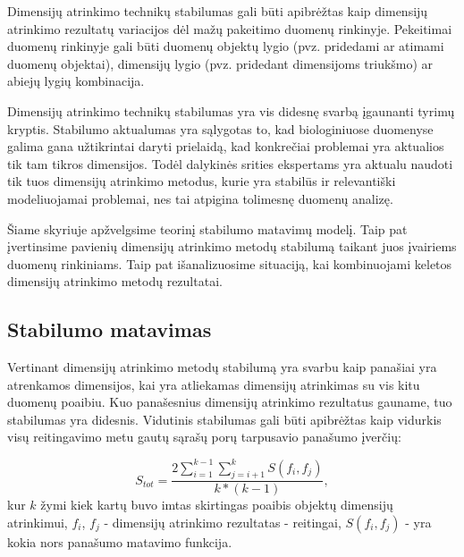 Dimensijų atrinkimo technikų stabilumas gali būti apibrėžtas kaip dimensijų
atrinkimo rezultatų variacijos dėl mažų pakeitimo duomenų rinkinyje. Pekeitimai
duomenų rinkinyje gali būti duomenų objektų lygio (pvz. pridedami ar atimami
duomenų objektai), dimensijų lygio (pvz. pridedant dimensijoms triukšmo) ar
abiejų lygių kombinacija.

Dimensijų atrinkimo technikų stabilumas yra vis didesnę svarbą įgaunanti tyrimų
kryptis. Stabilumo aktualumas yra sąlygotas to, kad biologiniuose duomenyse
galima gana užtikrintai daryti prielaidą, kad konkrečiai problemai yra
aktualios tik tam tikros dimensijos. Todėl dalykinės srities ekspertams yra
aktualu naudoti tik tuos dimensijų atrinkimo metodus, kurie yra stabilūs ir 
relevantiški modeliuojamai problemai, nes tai atpigina tolimesnę duomenų
analizę. 

Šiame skyriuje apžvelgsime teorinį stabilumo matavimų modelį.
Taip pat įvertinsime pavienių dimensijų atrinkimo metodų stabilumą
taikant juos įvairiems duomenų rinkiniams. Taip pat išanalizuosime situaciją, kai
kombinuojami keletos dimensijų atrinkimo metodų rezultatai.

\subsection{Stabilumo matavimas}

Vertinant dimensijų atrinkimo metodų stabilumą yra svarbu kaip panašiai yra
atrenkamos dimensijos, kai yra atliekamas dimensijų atrinkimas su vis kitu 
duomenų poaibiu. Kuo panašesnius dimensijų atrinkimo rezultatus gauname, tuo stabilumas
yra didesnis. Vidutinis stabilumas gali būti apibrėžtas kaip vidurkis visų 
reitingavimo metu gautų sąrašų porų tarpusavio panašumo įverčių:

\begin{equation}
 S_{tot}=\frac{2\sum_{i=1}^{k-1}\sum_{j=i+1}^{k} S(f_i, f_j)}{k*(k-1)},
\end{equation} 
kur $k$ žymi kiek kartų buvo imtas skirtingas poaibis objektų dimensijų atrinkimui,
$f_i$, $f_j$ - dimensijų atrinkimo rezultatas - reitingai, $S(f_i, f_j)$ - yra kokia 
nors panašumo matavimo funkcija.

